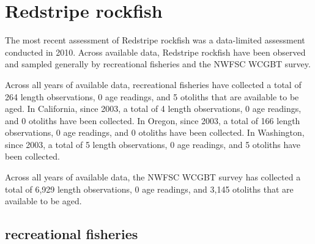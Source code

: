 \documentclass[11pt,
  english,
  letterpaper,
]{article}
\begin{document}

\hypertarget{redstripe-rockfish}{%
\section{Redstripe rockfish}\label{redstripe-rockfish}}

\leavevmode\tagmcend\tagstructend


The most recent assessment of Redstripe rockfish was a data-limited assessment conducted in 2010. Across available data, Redstripe rockfish have been observed and sampled generally by recreational fisheries and the NWFSC WCGBT survey.

\leavevmode\tagmcend\tagstructend\par


Across all years of available data, recreational fisheries have collected a total of 264 length observations, 0 age readings, and 5 otoliths that are available to be aged. In California, since 2003, a total of 4 length observations, 0 age readings, and 0 otoliths have been collected. In Oregon, since 2003, a total of 166 length observations, 0 age readings, and 0 otoliths have been collected. In Washington, since 2003, a total of 5 length observations, 0 age readings, and 5 otoliths have been collected.

\leavevmode\tagmcend\tagstructend\par


Across all years of available data, the NWFSC WCGBT survey has collected a total of 6,929 length observations, 0 age readings, and 3,145 otoliths that are available to be aged.

\leavevmode\tagmcend\tagstructend\par


\hypertarget{recreational-fisheries-27}{%
\subsection{recreational fisheries}\label{recreational-fisheries-27}}

\leavevmode\tagmcend\tagstructend

\end{document}
